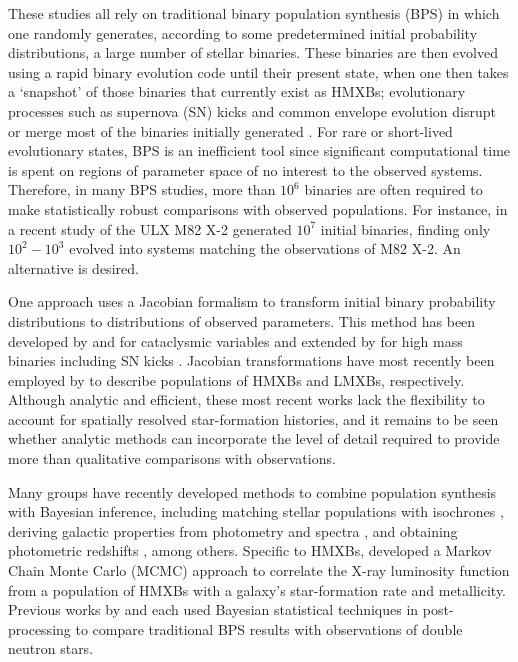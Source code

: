 \documentclass[usenatbib]{mnras}
\begin{document}
These studies all rely on traditional binary population synthesis (BPS) in which one randomly generates, according to some predetermined initial probability distributions, a large number of stellar binaries. These binaries are then evolved using a rapid binary evolution code until their present state, when one then takes a `snapshot' of those binaries that currently exist as HMXBs; evolutionary processes such as supernova (SN) kicks and common envelope evolution disrupt or merge most of the binaries initially generated \citep[For a recent discussion of state-of-the-art BPS codes and their differences, see;][]{toonen14}. For rare or short-lived evolutionary states, BPS is an inefficient tool since significant computational time is spent on regions of parameter space of no interest to the observed systems. Therefore, in many BPS studies, more than $10^6$ binaries are often required to make statistically robust comparisons with observed populations. For instance, in a recent study of the ULX M82 X-2 \citet{fragos15} generated $10^7$ initial binaries, finding only $10^2-10^3$ evolved into systems matching the observations of M82 X-2. An alternative is desired.


One approach uses a Jacobian formalism to transform initial binary probability distributions to distributions of observed parameters. This method has been developed by \citet{kolb93} and \citet{politano96} for cataclysmic variables and extended by \citet{kalogera96} for high mass binaries including SN kicks \citep[see also][]{kalogera98, kalogera00}. Jacobian transformations have most recently been employed by \citet{bhadkamkar12,bhadkamkar14} to describe populations of HMXBs and LMXBs, respectively. Although analytic and efficient, these most recent works lack the flexibility to account for spatially resolved star-formation histories, and it remains to be seen whether analytic methods can incorporate the level of detail required to provide more than qualitative comparisons with observations.


\newpage

Many groups have recently developed methods to combine population synthesis with Bayesian inference, including matching stellar populations with isochrones \citep{stenning16}, deriving galactic properties from photometry and spectra \citep{krumholz15}, and obtaining photometric redshifts \citep{tanaka15}, among others. Specific to HMXBs, \citet{douna15} developed a Markov Chain Monte Carlo (MCMC) approach to correlate the X-ray luminosity function from a population of HMXBs with a galaxy's star-formation rate and metallicity. Previous works by \citet{ihm06} and \citet{andrews15} each used Bayesian statistical techniques in post-processing to compare traditional BPS results with observations of double neutron stars.
\end{document}
